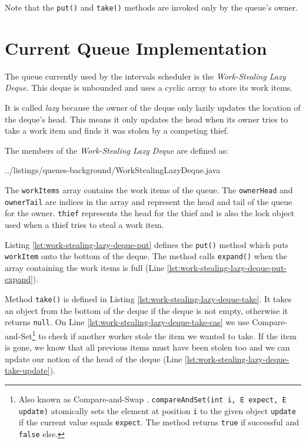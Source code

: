 Note that the \lstinline!put()! and \lstinline!take()! methods are
invoked only by the queue's owner.


\section{Current Queue Implementation}
\label{sec:queues-background-current-implementation}

The queue currently used by the intervals scheduler is the
\emph{Work-Stealing Lazy Deque}. This deque is unbounded and uses a
cyclic array to store its work items.

It is called \emph{lazy} because the owner of the deque only lazily
updates the location of the deque's head. This means it only updates
the head when its owner tries to take a work item and finds it was
stolen by a competing thief.

The members of the \emph{Work-Stealing Lazy Deque} are defined as:


{
    ../listings/queues-background/WorkStealingLazyDeque.java
}

The \lstinline!workItems! array contains the work items of the
queue. The \lstinline!ownerHead! and \lstinline!ownerTail! are indices
in the array and represent the head and tail of the queue for the
owner. \lstinline!thief! represents the head for the thief and is also
the lock object used when a thief tries to steal a work item.

Listing \ref{lst:work-stealing-lazy-deque-put} defines the
\lstinline!put()! method which puts \lstinline!workItem! onto the
bottom of the deque. The method calls \lstinline!expand()! when the
array containing the work items is full (Line
\ref{lst:work-stealing-lazy-deque-put-expand}).



\VerbatimFootnotes Method \lstinline!take()! is defined in Listing
\ref{lst:work-stealing-lazy-deque-take}. It takes an object from the
bottom of the deque if the deque is not empty, otherwise it returns
\lstinline!null!. On Line \ref{lst:work-stealing-lazy-deque-take-cas}
we use Compare-and-Set\footnote{Also known as Compare-and-Swap
  \cite{IBM1974}. \verb!compareAndSet(int i, E expect, E update)!
  atomically sets the element at position \verb!i! to the given object
  \verb!update! if the current value equals \verb!expect!. The method
  returns \verb!true! if successful and \verb!false! else.} to check
if another worker stole the item we wanted to take. If the item is
gone, we know that all previous items must have been stolen too and we
can update our notion of the head of the deque (Line
\ref{lst:work-stealing-lazy-deque-take-update}).

